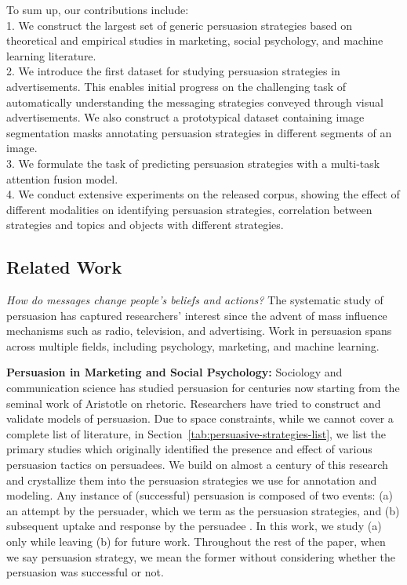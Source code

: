 To sum up, our contributions include:\\
1. We construct the largest set of generic persuasion strategies based on theoretical and empirical studies in marketing, social psychology, and machine learning literature. \\
2. We introduce the first dataset for studying persuasion strategies in advertisements. This enables initial progress on the challenging task of automatically understanding the messaging strategies conveyed through visual advertisements. We also construct a prototypical dataset containing image segmentation masks annotating persuasion strategies in different segments of an image.\\
3. We formulate the task of predicting persuasion strategies with a multi-task attention fusion model.\\
4. We conduct extensive experiments on the released corpus,
showing the effect of different modalities on identifying persuasion
strategies, correlation between strategies and topics
and objects with different strategies.\\

\subsection{Related Work}
\label{sec:related work-persuasion}


\textit{How do messages change people's beliefs and actions?} The systematic study of persuasion has captured researchers’ interest since the advent of mass influence mechanisms such as radio, television, and advertising. Work in persuasion spans across multiple fields, including psychology, marketing, and machine learning. 


\textbf{Persuasion in Marketing and Social Psychology:} Sociology and communication science has studied persuasion for centuries now starting from the seminal work of Aristotle on rhetoric. Researchers have tried to construct and validate models of persuasion. Due to space constraints, while we cannot cover a complete list of literature, in Section~\ref{tab:persuasive-strategies-list}, we list the primary studies which originally identified the presence and effect of various persuasion tactics on persuadees. We build on almost a century of this research and crystallize them into the persuasion strategies we use for annotation and modeling. %
Any instance of (successful) persuasion is composed of two events: (a) an attempt by the persuader, which we term as the persuasion strategies, and (b) subsequent uptake and response by the persuadee \cite{anand2011believe,vakratsas1999advertising}. In this work, we study (a) only while leaving (b) for future work. Throughout the rest of the paper, when we say persuasion strategy, we mean the former without considering whether the persuasion was successful or not. 




